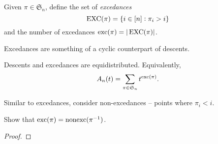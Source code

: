 	\begin{fdef}[Excedances]
		Given $\pi \in \mathfrak{S}_n$, define the set of \emph{excedances}
		\[ \operatorname{EXC}(\pi) = \{ i \in [n] : \pi_i > i \} \]
		and the number of excedances $\operatorname{exc}(\pi) = |\operatorname{EXC}(\pi)|$.
	\end{fdef}

	Excedances are something of a cyclic counterpart of descents. %

	\begin{ftheo}
		\label{theo: desc and exc}
		Descents and excedances are equidistributed. Equivalently,
		\[ A_n(t) = \sum_{\pi \in \mathfrak{S}_n} t^{\operatorname{exc}(\pi)}. \]
	\end{ftheo}
	Similar to excedances, consider non-excedances -- points where $\pi_i < i$.
	\begin{exercise}
		Show that $\operatorname{exc}(\pi) = \operatorname{nonexc}(\pi^{-1})$.
	\end{exercise}
	\begin{proof}
		
	\end{proof}
